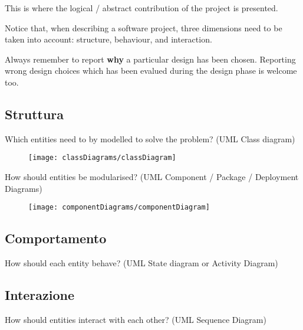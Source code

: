 This is where the logical / abstract contribution of the project is presented.

Notice that, when describing a software project, three dimensions need to be taken into account: structure, behaviour, and interaction.

Always remember to report \textbf{why} a particular design has been chosen.
Reporting wrong design choices which has been evalued during the design phase is welcome too.

\subsection{Struttura}

Which entities need to by modelled to solve the problem?
%
(UML Class diagram)

\begin{figure}[H]
  \centering
  \texttt{[image: classDiagrams/classDiagram]}
  \caption[classDiagramCaption]{}
  
  \label{fig:figure29}
\end{figure}

How should entities be modularised?
%
(UML Component / Package / Deployment Diagrams)

\begin{figure}[H]
  \centering
  \texttt{[image: componentDiagrams/componentDiagram]}
  \caption[componentDiagramCaption]{}
  
  \label{fig:figure30}
\end{figure}

\subsection{Comportamento}

How should each entity behave?
%
(UML State diagram or Activity Diagram)

\subsection{Interazione}

How should entities interact with each other?
%
(UML Sequence Diagram)
